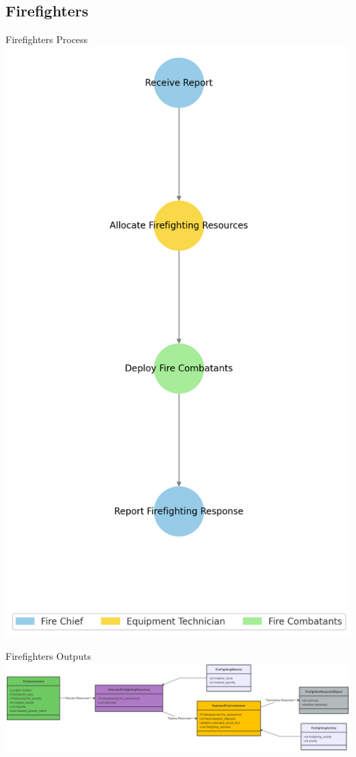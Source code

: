 \subsection{Firefighters}
\begin{frame}{Firefighters Process}
    \centering
    \includegraphics[height=\textheight]{figures/Firefighter_Crew_Flow.png}
\end{frame}

\begin{frame}{Firefighters Outputs}
    \centering
    \includegraphics[width=\textwidth]{figures/Firefighters_ClassDiagram.png}
\end{frame}
